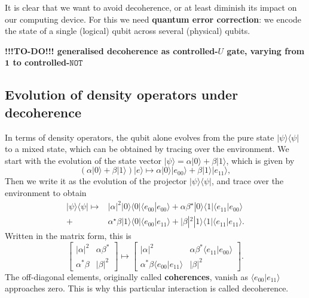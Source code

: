 \documentclass[fleqn]{article}
\newenvironment{idea}{\noindent}{\medskip}
\begin{document}
\begin{idea}
It is clear that we want to avoid decoherence, or at least diminish its impact on our computing device.
For this we need \textbf{quantum error correction}: we encode the state of a single (logical) qubit across several (physical) qubits.

\end{idea}

\textbf{!!!TO-DO!!! generalised decoherence as controlled-\(U\) gate, varying from \(\mathbf{1}\) to controlled-\(\texttt{NOT}\)}

\hypertarget{evolution-of-density-operators-under-decoherence}{%
\subsection{Evolution of density operators under decoherence}\label{evolution-of-density-operators-under-decoherence}}

In terms of density operators, the qubit alone evolves from the pure state \(|\psi\rangle\langle\psi|\) to a mixed state, which can be obtained by tracing over the environment.
We start with the evolution of the state vector \(|\psi\rangle=\alpha|0\rangle+\beta|1\rangle\), which is given by
\[
  \left( \alpha|0\rangle +\beta |1\rangle\right)|e\rangle \longmapsto
  \alpha |0\rangle|e_{00}\rangle +\beta |1\rangle |e_{11}\rangle,
\]
Then we write it as the evolution of the projector \(|\psi\rangle\langle\psi|\), and trace over the environment to obtain
\[
  \begin{aligned}
    |\psi\rangle\langle\psi| \longmapsto & |\alpha|^2|0\rangle\langle 0| \langle e_{00}|e_{00}\rangle+ \alpha\beta^\star |0\rangle\langle 1|\langle e_{11}|e_{00}\rangle
  \\+ &\alpha^\star\beta |1\rangle\langle 0|\langle e_{00}|e_{11}\rangle  + |\beta|^2|1\rangle\langle 1|\langle e_{11}|e_{11}\rangle.
  \end{aligned}
\]
Written in the matrix form, this is
\[
  \begin{bmatrix}
    |\alpha|^2 & \alpha\beta^\ast
  \\\alpha^\ast\beta & |\beta|^2
  \end{bmatrix}
  \longmapsto
  \begin{bmatrix}
    |\alpha|^2 & \alpha\beta^\ast \langle e_{11}|e_{00}\rangle
    \\\alpha^\ast\beta \langle e_{00}|e_{11}\rangle & |\beta|^2
  \end{bmatrix}.
\]
The off-diagonal elements, originally called \textbf{coherences}, vanish as \(\langle e_{00}|e_{11}\rangle\) approaches zero.
This is why this particular interaction is called decoherence.
\end{document}
